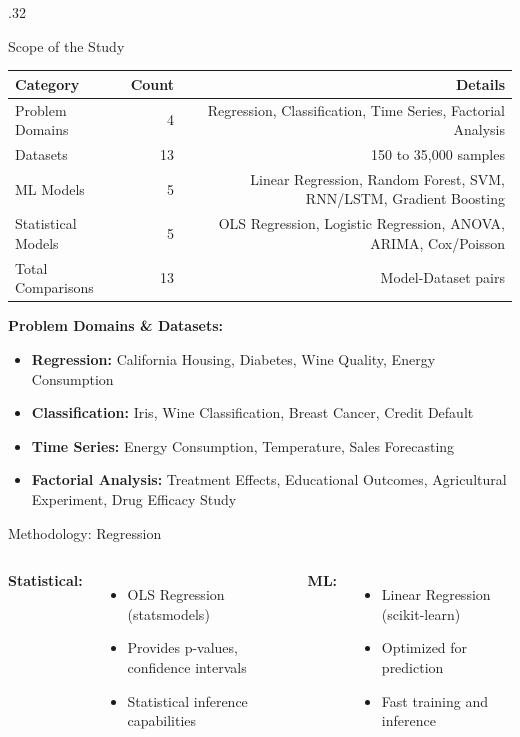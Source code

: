 \documentclass[final]{beamer}
\begin{document}
\begin{frame}[t]
\begin{columns}[t]
\begin{column}{.32\linewidth}
\begin{block}{Scope of the Study}
\centering
\begin{tabular}{lrr}
\toprule
\textbf{Category} & \textbf{Count} & \textbf{Details} \\
\midrule
Problem Domains & 4 & Regression, Classification, Time Series, Factorial Analysis \\
Datasets & 13 & 150 to 35,000 samples \\
ML Models & 5 & Linear Regression, Random Forest, SVM, RNN/LSTM, Gradient Boosting \\
Statistical Models & 5 & OLS Regression, Logistic Regression, ANOVA, ARIMA, Cox/Poisson \\
Total Comparisons & 13 & Model-Dataset pairs \\
\bottomrule
\end{tabular}

\vspace{0.5cm}
\textbf{Problem Domains \& Datasets:}
\begin{itemize}
    \item \textbf{Regression:} California Housing, Diabetes, Wine Quality, Energy Consumption
    \item \textbf{Classification:} Iris, Wine Classification, Breast Cancer, Credit Default
    \item \textbf{Time Series:} Energy Consumption, Temperature, Sales Forecasting
    \item \textbf{Factorial Analysis:} Treatment Effects, Educational Outcomes, Agricultural Experiment, Drug Efficacy Study
\end{itemize}
\end{block}

\begin{block}{Methodology: Regression}
\begin{columns}[t]
\textcolor{statcolor}{\textbf{Statistical:}}
\begin{itemize}
    \item OLS Regression (statsmodels)
    \item Provides p-values, confidence intervals
    \item Statistical inference capabilities
\end{itemize}

\textcolor{mlcolor}{\textbf{ML:}}
\begin{itemize}
    \item Linear Regression (scikit-learn)
    \item Optimized for prediction
    \item Fast training and inference
\end{itemize}
\end{columns}


\end{block}
\end{column}
\end{columns}
\end{frame}
\end{document}
